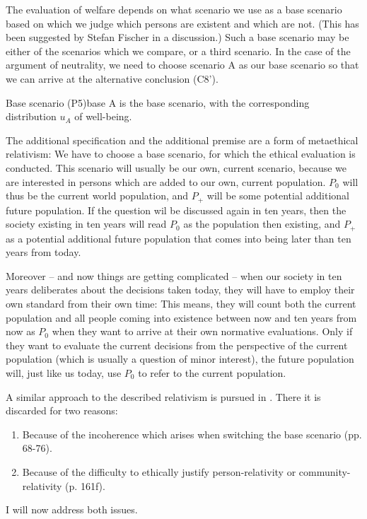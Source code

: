 The evaluation of welfare depends on what scenario we use as a base scenario based on which we judge which persons are existent and which are not. (This has been suggested by Stefan Fischer in a discussion.) Such a base scenario may be either of the scenarios which we compare, or a third scenario. In the case of the argument of neutrality, we need to choose scenario A as our base scenario so that we can arrive at the alternative conclusion (C8’). 

\begin{Premise}{Base scenario (P5)}{base}
A is the base scenario, with the corresponding distribution $u_A$ of well-being.
\end{Premise}

The additional specification and the additional premise are a form of metaethical relativism: We have to choose a base scenario, for which the ethical evaluation is conducted. This scenario will usually be our own, current scenario, because we are interested in persons which are added to our own, current population. $P_0$ will thus be the current world population, and $P_+$ will be some potential additional future population. If the question wil be discussed again in ten years, then the society existing in ten years will read $P_0$ as the population then existing, and $P_+$ as a potential additional future population that comes into being later than ten years from today. 

Moreover -- and now things are getting complicated -- when our society in ten years deliberates about the decisions taken today, they will have to employ their own standard from their own time: This means, they will count both the current population and all people coming into existence between now and ten years from now as $P_0$ when they want to arrive at their own normative evaluations. Only if they want to evaluate the current decisions from the perspective of the current population (which is usually a question of minor interest), the future population will, just like us today, use $P_0$ to refer to the current population. 

A similar approach to the described relativism is pursued in . There it is discarded for two reasons:
\begin{enumerate}
\item Because of the incoherence which arises when switching the base scenario (pp. 68-76). 
\item Because of the difficulty to ethically justify person-relativity or com\-mu\-ni\-ty-relativity (p. 161f). 
\end{enumerate}
I will now address both issues.  


